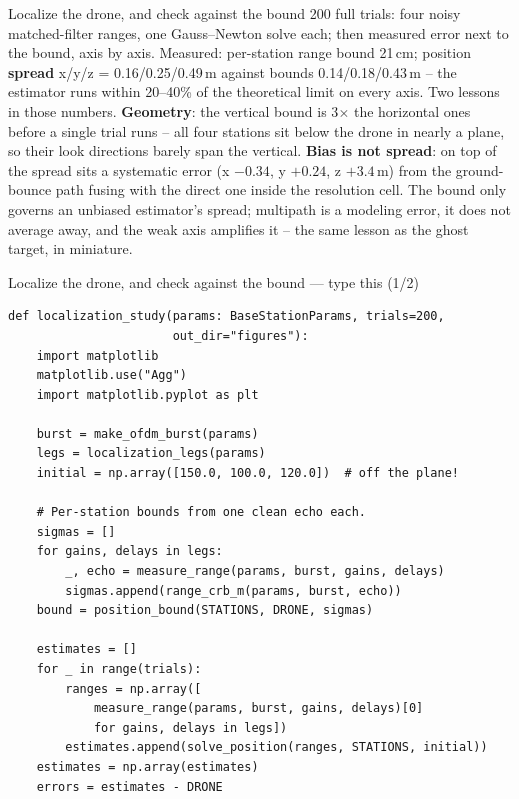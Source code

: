 \documentclass[10pt]{beamer}
\begin{document}
\begin{frame}{Localize the drone, and check against the bound}
  200 full trials: four noisy matched-filter ranges, one
  Gauss--Newton solve each; then measured error next to
  the bound, axis by axis. Measured: per-station range
  bound 21\,cm; position \textbf{spread} x/y/z =
  0.16/0.25/0.49\,m against bounds 0.14/0.18/0.43\,m --
  the estimator runs within 20--40\% of the theoretical
  limit on every axis. Two lessons in those numbers.
  \textbf{Geometry}: the vertical bound is 3$\times$ the
  horizontal ones before a single trial runs -- all four
  stations sit below the drone in nearly a plane, so their
  look directions barely span the vertical. \textbf{Bias
  is not spread}: on top of the spread sits a systematic
  error (x $-0.34$, y $+0.24$, z $+3.4$\,m) from the
  ground-bounce path fusing with the direct one inside the
  resolution cell. The bound only governs an unbiased
  estimator's spread; multipath is a modeling error, it
  does not average away, and the weak axis amplifies it --
  the same lesson as the ghost target, in miniature.
\end{frame}

\begin{frame}[fragile]{Localize the drone, and check against the bound --- type this (1/2)}
\begin{lstlisting}[basicstyle=\ttfamily\tiny]
def localization_study(params: BaseStationParams, trials=200,
                       out_dir="figures"):
    import matplotlib
    matplotlib.use("Agg")
    import matplotlib.pyplot as plt

    burst = make_ofdm_burst(params)
    legs = localization_legs(params)
    initial = np.array([150.0, 100.0, 120.0])  # off the plane!

    # Per-station bounds from one clean echo each.
    sigmas = []
    for gains, delays in legs:
        _, echo = measure_range(params, burst, gains, delays)
        sigmas.append(range_crb_m(params, burst, echo))
    bound = position_bound(STATIONS, DRONE, sigmas)

    estimates = []
    for _ in range(trials):
        ranges = np.array([
            measure_range(params, burst, gains, delays)[0]
            for gains, delays in legs])
        estimates.append(solve_position(ranges, STATIONS, initial))
    estimates = np.array(estimates)
    errors = estimates - DRONE
\end{lstlisting}
\end{frame}
\end{document}
